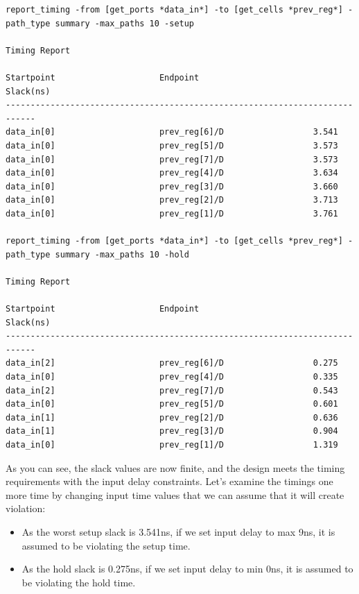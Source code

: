 \documentclass{report}
\begin{document}
\begin{verbatim}
report_timing -from [get_ports *data_in*] -to [get_cells *prev_reg*] -path_type summary -max_paths 10 -setup

Timing Report

Startpoint                     Endpoint                       Slack(ns)     
----------------------------------------------------------------------------
data_in[0]                     prev_reg[6]/D                  3.541         
data_in[0]                     prev_reg[5]/D                  3.573         
data_in[0]                     prev_reg[7]/D                  3.573         
data_in[0]                     prev_reg[4]/D                  3.634         
data_in[0]                     prev_reg[3]/D                  3.660         
data_in[0]                     prev_reg[2]/D                  3.713         
data_in[0]                     prev_reg[1]/D                  3.761 

report_timing -from [get_ports *data_in*] -to [get_cells *prev_reg*] -path_type summary -max_paths 10 -hold

Timing Report

Startpoint                     Endpoint                       Slack(ns)     
----------------------------------------------------------------------------
data_in[2]                     prev_reg[6]/D                  0.275         
data_in[0]                     prev_reg[4]/D                  0.335         
data_in[2]                     prev_reg[7]/D                  0.543         
data_in[0]                     prev_reg[5]/D                  0.601         
data_in[1]                     prev_reg[2]/D                  0.636         
data_in[1]                     prev_reg[3]/D                  0.904         
data_in[0]                     prev_reg[1]/D                  1.319    
\end{verbatim}
As you can see, the slack values are now finite, and the design meets the timing requirements with the input delay constraints. Let's examine the timings one more time by changing input time values that we can assume that it will create violation:
\begin{itemize}
    \item As the worst setup slack is 3.541ns, if we set input delay to max 9ns, it is assumed to be violating the setup time.
    \item As the hold slack is 0.275ns, if we set input delay to min 0ns, it is assumed to be violating the hold time.
\end{itemize}
\end{document}
